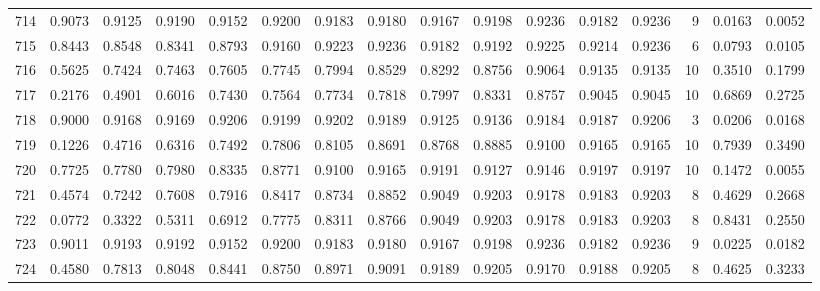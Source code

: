 \begin{tabular}{lrrrrrrrrrrrrrrr}
714 &      0.9073 &  0.9125 &  0.9190 &  0.9152 &  0.9200 &  0.9183 &  0.9180 &  0.9167 &  0.9198 &  0.9236 &   0.9182 &     0.9236 &      9 &                    0.0163 &                     0.0052 \\
715 &      0.8443 &  0.8548 &  0.8341 &  0.8793 &  0.9160 &  0.9223 &  0.9236 &  0.9182 &  0.9192 &  0.9225 &   0.9214 &     0.9236 &      6 &                    0.0793 &                     0.0105 \\
716 &      0.5625 &  0.7424 &  0.7463 &  0.7605 &  0.7745 &  0.7994 &  0.8529 &  0.8292 &  0.8756 &  0.9064 &   0.9135 &     0.9135 &     10 &                    0.3510 &                     0.1799 \\
717 &      0.2176 &  0.4901 &  0.6016 &  0.7430 &  0.7564 &  0.7734 &  0.7818 &  0.7997 &  0.8331 &  0.8757 &   0.9045 &     0.9045 &     10 &                    0.6869 &                     0.2725 \\
718 &      0.9000 &  0.9168 &  0.9169 &  0.9206 &  0.9199 &  0.9202 &  0.9189 &  0.9125 &  0.9136 &  0.9184 &   0.9187 &     0.9206 &      3 &                    0.0206 &                     0.0168 \\
719 &      0.1226 &  0.4716 &  0.6316 &  0.7492 &  0.7806 &  0.8105 &  0.8691 &  0.8768 &  0.8885 &  0.9100 &   0.9165 &     0.9165 &     10 &                    0.7939 &                     0.3490 \\
720 &      0.7725 &  0.7780 &  0.7980 &  0.8335 &  0.8771 &  0.9100 &  0.9165 &  0.9191 &  0.9127 &  0.9146 &   0.9197 &     0.9197 &     10 &                    0.1472 &                     0.0055 \\
721 &      0.4574 &  0.7242 &  0.7608 &  0.7916 &  0.8417 &  0.8734 &  0.8852 &  0.9049 &  0.9203 &  0.9178 &   0.9183 &     0.9203 &      8 &                    0.4629 &                     0.2668 \\
722 &      0.0772 &  0.3322 &  0.5311 &  0.6912 &  0.7775 &  0.8311 &  0.8766 &  0.9049 &  0.9203 &  0.9178 &   0.9183 &     0.9203 &      8 &                    0.8431 &                     0.2550 \\
723 &      0.9011 &  0.9193 &  0.9192 &  0.9152 &  0.9200 &  0.9183 &  0.9180 &  0.9167 &  0.9198 &  0.9236 &   0.9182 &     0.9236 &      9 &                    0.0225 &                     0.0182 \\
724 &      0.4580 &  0.7813 &  0.8048 &  0.8441 &  0.8750 &  0.8971 &  0.9091 &  0.9189 &  0.9205 &  0.9170 &   0.9188 &     0.9205 &      8 &                    0.4625 &                     0.3233 \\

\end{tabular}
